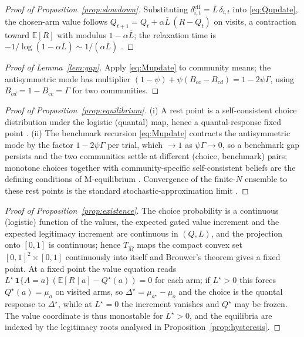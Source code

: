 \documentclass[11pt]{article}
\newcommand{\E}{\mathbb{E}}
\newcommand{\1}{\mathbf{1}}
\begin{document}
\begin{proof}[Proof of Proposition~\ref{prop:slowdown}]
Substituting $\delta^{\mathrm{eff}}_{i,t}=\bar L\,\delta_{i,t}$ into
\eqref{eq:Qupdate}, the chosen-arm value follows
$Q_{t+1}=Q_t+\alpha\bar L\,(R-Q_t)$ on visits, a contraction toward $\E[R]$ with
modulus $1-\alpha\bar L$; the relaxation time is
$-1/\log(1-\alpha\bar L)\sim 1/(\alpha\bar L)$
\citep{SuttonBarto2018,Borkar2008}.
\end{proof}

\begin{proof}[Proof of Lemma~\ref{lem:gap}]
Apply \eqref{eq:Mupdate} to community means; the antisymmetric mode has
multiplier $(1-\psi)+\psi(B_{cc}-B_{cd})=1-2\psi\Gamma$, using
$B_{cd}=1-B_{cc}=\Gamma$ for two communities.
\end{proof}

\begin{proof}[Proof of Proposition~\ref{prop:equilibrium}]
(i) A rest point is a self-consistent choice distribution under the logistic
(quantal) map, hence a quantal-response fixed point \citep{McKelveyPalfrey1995}.
(ii) The benchmark recursion \eqref{eq:Mupdate} contracts the antisymmetric mode
by the factor $1-2\psi\Gamma$ per trial, which $\to1$ as $\psi\Gamma\to0$, so a
benchmark gap persists and the two communities settle at different
(choice, benchmark) pairs; monotone choices together with community-specific
self-consistent beliefs are the defining conditions of M-equilibrium
\citep{GoereeLouis2021}. Convergence of the finite-$N$ ensemble to these rest
points is the standard stochastic-approximation limit \citep{Borkar2008}.
\end{proof}

\begin{proof}[Proof of Proposition~\ref{prop:existence}]
The choice probability is a continuous (logistic) function of the values, the
expected gated value increment and the expected legitimacy increment are
continuous in $(Q,L)$, and the projection onto $[0,1]$ is continuous; hence
$T_{\hat M}$ maps the compact convex set $[0,1]^2\times[0,1]$ continuously into
itself and Brouwer's theorem gives a fixed point. At a fixed point the value
equation reads $L^\star\,\1\{A=a\}\,(\E[R\mid a]-Q^\star(a))=0$ for each arm; if
$L^\star>0$ this forces $Q^\star(a)=\mu_a$ on visited arms, so
$\Delta^\star=\mu_{a^\star}-\mu_o$ and the choice is the quantal response to
$\Delta^\star$, while at $L^\star=0$ the increment vanishes and $Q^\star$ may be
frozen. The value coordinate is thus monostable for $L^\star>0$, and the
equilibria are indexed by the legitimacy roots analysed in
Proposition~\ref{prop:hysteresis}.
\end{proof}
\end{document}
